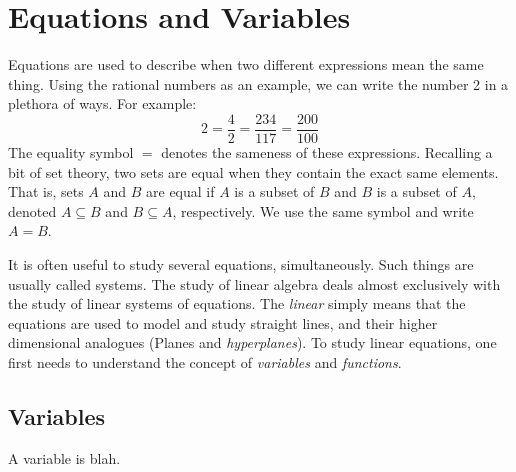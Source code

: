 \documentclass[crop=false,class=book,oneside]{standalone}                      %
\begin{document}
    \section{Equations and Variables}
        Equations are used to describe when two different expressions mean the
        same thing. Using the rational numbers as an example, we can write
        the number 2 in a plethora of ways. For example:
        \begin{equation}
            2=\frac{4}{2}=\frac{234}{117}=\frac{200}{100}
        \end{equation}
        The equality symbol $=$ denotes the sameness of these expressions.
        Recalling a bit of set theory, two sets are equal when they contain
        the exact same elements. That is, sets $A$ and $B$ are equal if
        $A$ is a subset of $B$ and $B$ is a subset of $A$, denoted
        $A\subseteq{B}$ and $B\subseteq{A}$, respectively. We use the same
        symbol and write $A=B$.
        \par\hfill\par
        It is often useful to study several equations, simultaneously. Such
        things are usually called systems. The study of linear algebra deals
        almost exclusively with the study of linear systems of equations. The
        \textit{linear} simply means that the equations are used to model and
        study straight lines, and their higher dimensional analogues
        (Planes and \textit{hyperplanes}). To study linear equations, one
        first needs to understand the concept of \textit{variables} and
        \textit{functions}.
        \subsection{Variables}
            A variable is blah.
\end{document}
